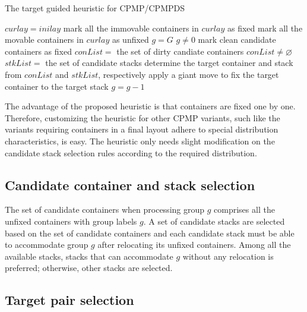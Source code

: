 \documentclass[review,3p,times,authoryear,12pt]{elsarticle}
\begin{document}
\begin{algorithm*}[!htb]
	\caption{The target guided heuristic for CPMP/CPMPDS}
	\label{alg:heu}
	\begin{codebox}
	\li $\mathit{curlay} = \mathit{inilay}$
    \li mark all the immovable containers in $\mathit{curlay}$ as fixed
    \li mark all the movable containers in $\mathit{curlay}$ as unfixed
    \li $\mathit{g} = G$
    \li \While $g\neq0$
    \li \Do
            mark clean candidate containers as fixed\label{heu:c}
    \li     $\mathit{conList} = $ the set of dirty candiate containers
    \li     \While $\mathit{conList} \neq \varnothing$\label{heu:l}
    \li     \Do
                $\mathit{stkList} = $ the set of candidate stacks
    \li         determine the target container and stack from $\mathit{conList}$ and $\mathit{stkList}$, respectively
    \li         apply a giant move to fix the target container to the target stack
            \End
    \li $g=g-1$
        \End
	\end{codebox}
\end{algorithm*}


The advantage of the proposed heuristic is that containers are fixed one by one. 
Therefore, customizing the heuristic for other CPMP variants, such like the variants requiring containers in a final layout adhere to special distribution characteristics, is easy. 
The heuristic only needs slight modification on the candidate stack selection rules according to the required distribution.

\subsection{Candidate container and stack selection}
\label{sec:can}

The set of candidate containers when processing group $g$ comprises all the unfixed containers with group labels $g$. 
A set of candidate stacks are selected based on the set of candidate containers and each candidate stack must be able to accommodate group $g$ after relocating its unfixed containers.
Among all the available stacks, stacks that can accommodate $g$ without any relocation is preferred; otherwise, other stacks are selected.

\subsection{Target pair selection}
\label{sec:tar}
\end{document}
